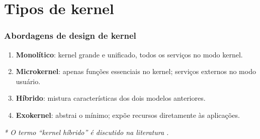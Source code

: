 \documentclass{beamer}
\begin{document}
\section{Tipos de kernel}

\begin{frame}[fragile]
    \frametitle{Abordagens de design de kernel}

    \begin{enumerate}\small
        \item \textbf{Monolítico}: kernel grande e unificado, todos os serviços no modo kernel.
        \item \textbf{Microkernel}: apenas funções essenciais no kernel; serviços externos no modo usuário.
        \item \textbf{Híbrido}: mistura características dos dois modelos anteriores.
        \item \textbf{Exokernel}: abstrai o mínimo; expõe recursos diretamente às aplicações.
    \end{enumerate}

    \vfill
    \begin{center}
        \textit{* O termo ``kernel híbrido'' \'{e} discutido na literatura \cite{microkernel2007}.}
    \end{center}
\end{frame}
\end{document}
